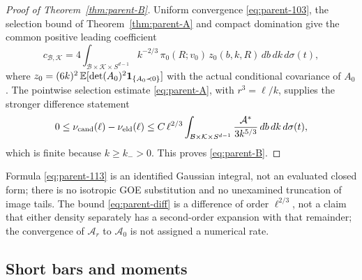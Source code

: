\begin{proof}[Proof of Theorem~\ref{thm:parent-B}]
Uniform convergence \eqref{eq:parent-103}, the selection bound of Theorem~\ref{thm:parent-A} and compact domination give the common positive leading coefficient
\begin{equation}\label{eq:parent-113}
c_{\mathcal B,\mathcal K}=4\int_{\mathcal B\times\mathcal K\times S^{d-1}}k^{-2/3}\,\pi_0(R;v_0)\,z_0(b,k,R)\,db\,dk\,d\sigma(t),
\end{equation}
where $z_0=(6k)^2\,\mathbb E[\det(A_0)^2\mathbf 1_{\{A_0\prec0\}}]$ with the actual conditional covariance of $A_0$. The pointwise selection estimate \eqref{eq:parent-A}, with $r^3=\ell/k$, supplies the stronger difference statement
\begin{equation}\label{eq:parent-diff}
0\le\nu_{\mathrm{cand}}(\ell)-\nu_{\mathrm{eld}}(\ell)\le C\,\ell^{2/3}\int_{\mathcal B\times\mathcal K\times S^{d-1}}\frac{\mathcal A^*}{3k^{5/3}}\,db\,dk\,d\sigma(t),
\end{equation}
which is finite because $k\ge k_->0$. This proves \eqref{eq:parent-B}.
\end{proof}

Formula \eqref{eq:parent-113} is an identified Gaussian integral, not an evaluated closed form; there is no isotropic GOE substitution and no unexamined truncation of image tails. The bound \eqref{eq:parent-diff} is a difference of order $\ell^{2/3}$, not a claim that either density separately has a second-order expansion with that remainder; the convergence of $\mathcal A_r$ to $\mathcal A_0$ is not assigned a numerical rate.

\subsection{Short bars and moments}\label{ssec:parent-moments}

